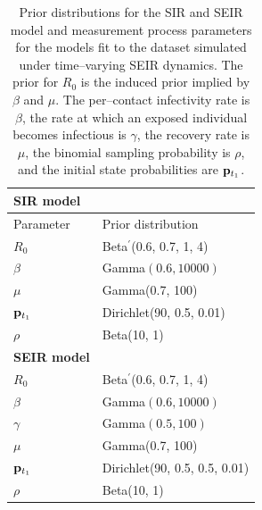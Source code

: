 \begin{table}[htbp]
	\centering
	\begin{tabular}{ll}
		\textbf{SIR model} & \\
		\hline\hline
		Parameter & Prior distribution \\ 
		\hline
		$ R_0 $ &  Beta$ ^\prime $(0.6, 0.7, 1, 4) \\
		$ \beta $ &  Gamma$ (0.6, 10000) $ \\
		$ \mu $ &  Gamma(0.7, 100) \\ 
		$ \mathbf{p}_{t_1} $ &  Dirichlet(90, 0.5, 0.01)  \\ 
		$ \rho $ &  Beta(10, 1) \\
		\hline	
		\textbf{SEIR model} & \\
		\hline\hline
		$ R_0 $ &  Beta$ ^\prime $(0.6, 0.7, 1, 4) \\
		$ \beta $ &  Gamma$ (0.6, 10000) $ \\
		$ \gamma $ &  Gamma$ (0.5, 100) $\\ 
		$ \mu $ &  Gamma(0.7, 100) \\ 
		$ \mathbf{p}_{t_1} $ &  Dirichlet(90, 0.5, 0.5, 0.01)  \\ 
		$ \rho $ &  Beta(10, 1) \\
		\hline
	\end{tabular}
	\caption[Simulation 2 priors for SIR and SEIR models.]{Prior distributions for the SIR and SEIR model and measurement process parameters for the models fit to the dataset simulated under time--varying SEIR dynamics. The prior for $ R_0 $ is the induced prior implied by $ \beta $ and $ \mu $. The per--contact infectivity rate is $ \beta $, the rate at which an exposed individual becomes infectious is $ \gamma $, the recovery rate is $ \mu $, the binomial sampling probability is $ \rho $, and the initial state probabilities are $ \mathbf{p}_{t_1} $.}
	\label{tab:misspec_priors}
\end{table}

\newpage
